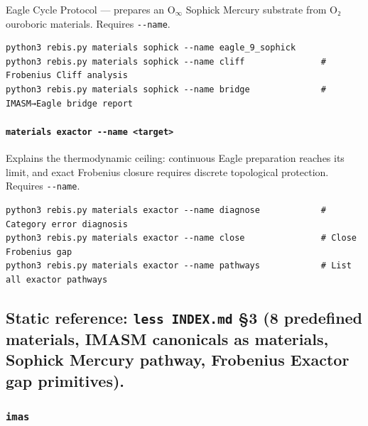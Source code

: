 \documentclass[12pt,a4paper]{article}
\begin{document}
Eagle Cycle Protocol --- prepares an \(\text{O}_{\infty}\) Sophick
Mercury substrate from O₂ ouroboric materials. Requires
\texttt{-\/-name}.

\begin{verbatim}
python3 rebis.py materials sophick --name eagle_9_sophick
python3 rebis.py materials sophick --name cliff               # Frobenius Cliff analysis
python3 rebis.py materials sophick --name bridge              # IMASM→Eagle bridge report
\end{verbatim}

\hypertarget{materials-exactor---name-target}{%
\paragraph{\texorpdfstring{\texttt{materials\ exactor\ -\/-name\ \textless{}target\textgreater{}}}{materials exactor -\/-name \textless target\textgreater{}}}\label{materials-exactor---name-target}}

Explains the thermodynamic ceiling: continuous Eagle preparation reaches
its limit, and exact Frobenius closure requires discrete topological
protection. Requires \texttt{-\/-name}.

\begin{verbatim}
python3 rebis.py materials exactor --name diagnose            # Category error diagnosis
python3 rebis.py materials exactor --name close               # Close Frobenius gap
python3 rebis.py materials exactor --name pathways            # List all exactor pathways
\end{verbatim}

\hypertarget{static-reference-less-index.md-3-8-predefined-materials-imasm-canonicals-as-materials-sophick-mercury-pathway-frobenius-exactor-gap-primitives.}{%
\subsection{\texorpdfstring{\textbf{Static reference:}
\texttt{less\ INDEX.md} §3 (8 predefined materials, IMASM canonicals as
materials, Sophick Mercury pathway, Frobenius Exactor gap
primitives).}{Static reference: less INDEX.md §3 (8 predefined materials, IMASM canonicals as materials, Sophick Mercury pathway, Frobenius Exactor gap primitives).}}\label{static-reference-less-index.md-3-8-predefined-materials-imasm-canonicals-as-materials-sophick-mercury-pathway-frobenius-exactor-gap-primitives.}}

\hypertarget{imas}{%
\subsubsection{\texorpdfstring{\texttt{imas}}{imas}}\label{imas}}
\end{document}
